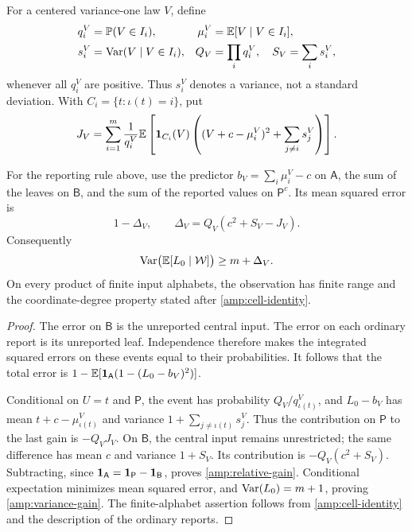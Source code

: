 For a centered variance-one law $V$, define
\begin{align}
 q_i^V&=\mathbb P(V\in I_i),&
 \mu_i^V&=\mathbb E[V\mid V\in I_i],\notag\\
 s_i^V&=\operatorname{Var}(V\mid V\in I_i),&
 Q_V&=\prod_iq_i^V,\quad S_V=\sum_i s_i^V,
 \label{amp:interval-parameters}
\end{align}
whenever all $q_i^V$ are positive.  Thus $s_i^V$ denotes a variance, not
a standard deviation.  With $C_i=\{t:\iota(t)=i\}$, put
\begin{equation}
 J_V=\sum_{i=1}^m\frac1{q_i^V}
       \mathbb E\left[\mathbf 1_{C_i}(V)
       \left((V+c-\mu_i^V)^2+\sum_{j\ne i}s_j^V\right)\right].
 \label{amp:J}
\end{equation}

\begin{proposition}
\label{amp:reporter}
For the reporting rule above, use the predictor
$b_V=\sum_i\mu_i^V-c$ on $\mathsf A$, the sum of the leaves on
$\mathsf B$, and the sum of the reported values on $\mathsf P^c$.
Its mean squared error is
\begin{equation}
 1-\Delta_V,\qquad
 \Delta_V=Q_V(c^2+S_V-J_V).
 \label{amp:relative-gain}
\end{equation}
Consequently
\begin{equation}
 \operatorname{Var}\bigl(\mathbb E[L_0\mid\mathcal W]\bigr)\ge m+\Delta_V.
 \label{amp:variance-gain}
\end{equation}
On every product of finite input alphabets, the observation has finite
range and the coordinate-degree property stated after
\eqref{amp:cell-identity}.
\end{proposition}

\begin{proof}
The error on $\mathsf B$ is the unreported central input.  The error on
each ordinary report is its unreported leaf.  Independence therefore makes
the integrated squared errors on these events equal to their probabilities.
It follows that the total error is
$1-\mathbb E[\mathbf 1_{\mathsf A}(1-(L_0-b_V)^2)]$.

Conditional on $U=t$ and $\mathsf P$, the event has probability
$Q_V/q_{\iota(t)}^V$, and $L_0-b_V$ has mean
$t+c-\mu_{\iota(t)}^V$ and variance
$1+\sum_{j\ne\iota(t)}s_j^V$.  Thus the contribution on
$\mathsf P$ to the last gain is $-Q_VJ_V$.  On $\mathsf B$, the
central input remains unrestricted; the same difference has mean $c$ and
variance $1+S_V$.  Its contribution is $-Q_V(c^2+S_V)$.
Subtracting, since $\mathbf 1_{\mathsf A}=\mathbf 1_{\mathsf P}-\mathbf 1_{\mathsf B}$,
proves \eqref{amp:relative-gain}.  Conditional expectation minimizes
mean squared error, and $\operatorname{Var}(L_0)=m+1$, proving
\eqref{amp:variance-gain}.  The finite-alphabet assertion follows from
\eqref{amp:cell-identity} and the description of the ordinary reports.
\end{proof}

